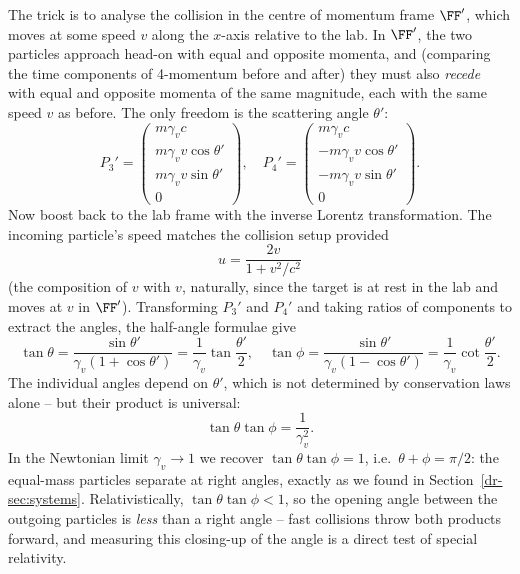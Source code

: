 \documentclass[a4paper]{scrartcl}
\begin{document}
The trick is to analyse the collision in the centre of momentum frame $\FF'$, which moves at some speed $v$ along the $x$-axis relative to the lab. In $\FF'$, the two particles approach head-on with equal and opposite momenta, and (comparing the time components of 4-momentum before and after) they must also \emph{recede} with equal and opposite momenta of the same magnitude, each with the same speed $v$ as before. The only freedom is the scattering angle $\theta'$:
$$
P_3' = \begin{pmatrix} m\gamma_v c \\ m \gamma_v v \cos\theta' \\ m \gamma_v v \sin \theta' \\ 0\end{pmatrix}, \quad P_4' = \begin{pmatrix} m\gamma_v c \\ -m \gamma_v v \cos\theta' \\ -m \gamma_v v \sin \theta' \\ 0\end{pmatrix}.
$$
Now boost back to the lab frame with the inverse Lorentz transformation. The incoming particle's speed matches the collision setup provided
$$
u = \frac{2v}{1 + v^2/c^2}
$$
(the composition of $v$ with $v$, naturally, since the target is at rest in the lab and moves at $v$ in $\FF'$). Transforming $P_3'$ and $P_4'$ and taking ratios of components to extract the angles, the half-angle formulae give
$$
\tan \theta = \frac{\sin\theta'}{\gamma_v (1 + \cos\theta')} = \frac{1}{\gamma_v} \tan \frac{\theta'}{2}, \quad
\tan \phi = \frac{\sin\theta'}{\gamma_v (1 - \cos\theta')} = \frac{1}{\gamma_v} \cot \frac{\theta'}{2}.
$$
The individual angles depend on $\theta'$, which is not determined by conservation laws alone -- but their product is universal:
$$
\tan\theta \tan\phi = \frac{1}{\gamma_v^2}.
$$
In the Newtonian limit $\gamma_v \to 1$ we recover $\tan\theta\tan\phi = 1$, i.e.\ $\theta + \phi = \pi/2$: the equal-mass particles separate at right angles, exactly as we found in Section~\ref{dr-sec:systems}. Relativistically, $\tan\theta\tan\phi < 1$, so the opening angle between the outgoing particles is \emph{less} than a right angle -- fast collisions throw both products forward, and measuring this closing-up of the angle is a direct test of special relativity.
\end{document}
